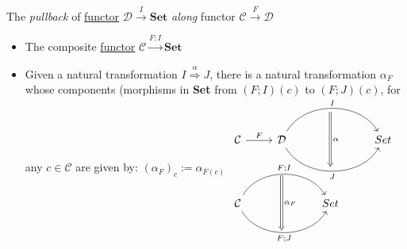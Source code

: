 The \emph{pullback} of \hyperref[D3.35]{functor} $\mathcal{D}\xrightarrow{I}\mathbf{Set}$ \emph{along} functor $\mathcal{C}\xrightarrow{F}\mathcal{D}$

\begin{itemize}
    \item  The composite \hyperref[D3.35]{functor} $\mathcal{C}\xrightarrow{F;I}\mathbf{Set}$
    \item Given a natural transformation $I \overset{\alpha}\Rightarrow J$, there is a natural transformation $\alpha_F$ whose components (morphisms in \textbf{Set} from $(F;I)(c)$ to $(F;J)(c)$, for any $c \in \mathcal{C}$ are given by: $(\alpha_F)_c := \alpha_{F(c)}$
          $\begin{tikzcd}                                                                             &                                                                           & \! \arrow[dd,Rightarrow,"\alpha"] &     \\\mathcal{C} \arrow[r, "F"]& \mathcal{D}\arrow[rr, "I", bend left=60] \arrow[rr, "J"', bend right=60] && Set \\& \! \arrow[dd,Rightarrow,"\alpha_F"]& \!&     \\\mathcal{C} \arrow[rr, "F;I", bend left=60] \arrow[rr, "F;J"', bend right=60]&&Set&     \\&\!&&    \end{tikzcd}$

  \end{itemize}
